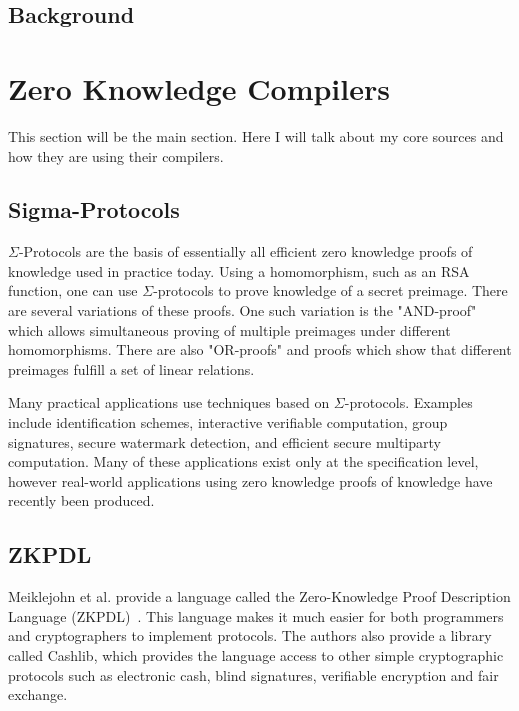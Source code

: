 \documentclass{sig-alternate}
\begin{document}
	\subsection{Background}
	

\section{Zero Knowledge Compilers}
	This section will be the main section. Here I will talk about my core sources and
	how they are using their compilers.

	\subsection{Sigma-Protocols}
		$\Sigma$-Protocols are the basis of essentially all efficient zero knowledge
		proofs of knowledge used in practice today. Using a homomorphism, such as an
		RSA function, one can use $\Sigma$-protocols to prove knowledge of a secret
		preimage. There are several variations of these proofs. One such variation is
		the "AND-proof" which allows simultaneous proving of multiple preimages under
		different homomorphisms. There are also "OR-proofs" and proofs which show
		that different preimages fulfill a set of linear relations.~\cite{Sigma:2009}
		
		Many practical applications use techniques based on $\Sigma$-protocols. Examples
		include identification schemes, interactive verifiable computation, group
		signatures, secure watermark detection, and efficient secure multiparty
		computation. Many of these applications exist only at the specification level,
		however real-world applications using zero knowledge proofs of knowledge have
		recently been produced.
		
	\subsection{ZKPDL}
		Meiklejohn et al. provide a language called the Zero-Knowledge Proof Description
		Language (ZKPDL)~\cite{ZKPDL:2010}. This language makes it much easier for both
		programmers and 	cryptographers to implement protocols. The authors also provide
		a library called Cashlib, which provides the language access to other simple
		cryptographic protocols such as electronic cash, blind signatures, verifiable
		encryption and fair exchange.
		
\end{document}
